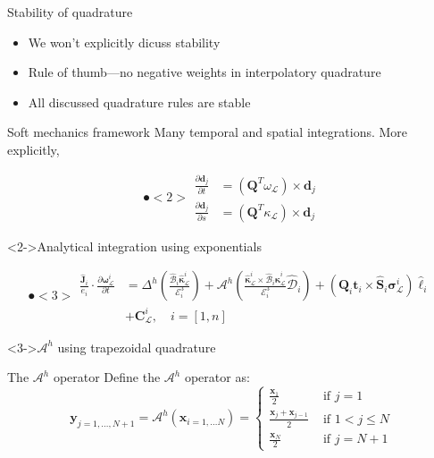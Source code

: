 \documentclass[presentation]{beamer}
\newcommand{\bv}[1]{\ensuremath{\mathbf{#1}}}
\begin{document}
\begin{frame}[label={sec:org7111bb9}]{Stability of quadrature}
\begin{itemize}
\item We won't explicitly dicuss stability
\item \alert{Rule of thumb}---no negative weights in interpolatory quadrature
\item All discussed quadrature rules are stable
\end{itemize}
\end{frame}
\begin{frame}[label={sec:orgde94351}]{Soft mechanics framework}
Many temporal and spatial integrations. More explicitly,

\[ \spot<2>{\begin{aligned}
   \frac{\partial \bv{d}_j}{\partial t} &= \left( \bv{Q}^T
   \omega_{\mathcal{L}}\right) \times \bv{d}_j \\
   \frac{\partial \bv{d}_j}{\partial s} &= \left( \bv{Q}^T
   \kappa_{\mathcal{L}}\right) \times \bv{d}_j
   \end{aligned}} \]
\begin{block}<2->{Analytical integration using exponentials}
\end{block}
\[ \spot<3>{\begin{aligned}\frac{\hat{\mathbf{J}}_i}{e_i} \cdot \frac{\partial
	\boldsymbol{\omega}^i_{\mathcal{L}}}{\partial t} &=
	\Delta^h\left(\frac{\hat{\boldsymbol{\mathcal{B}}}_i\hat{\boldsymbol{\kappa}}_{\mathcal{L}}^{i}}{\mathcal{E}_i^3}\right) +
	\mathcal{A}^h\left(\frac{\hat{\boldsymbol{\kappa}}_{\mathcal{L}}^i\times\hat{\boldsymbol{\mathcal{B}}}_i
	\hat{\boldsymbol{\kappa}}_{\mathcal{L}}^i}{\mathcal{E}_i^3}
	\hat{\mathcal{D}}_i\right) + \left(\mathbf{Q}_i\mathbf{t}_i\times\hat{\mathbf{S}}_i\boldsymbol{\sigma}^i_{\mathcal{L}}\right)\hat{\ell}_i\\
	&+ \mathbf{C}^i_{\mathcal{L}},\quad i=[1,n] \end{aligned}}\]
\begin{block}<3->{\(\mathcal{A}^{h}\) using trapezoidal quadrature}
\end{block}
\end{frame}
\begin{frame}[label={sec:org1c0b18f}]{The \(\mathcal{A}^{h}\) operator}
Define the \(\mathcal{A}^{h}\) operator as:
\[ \mathbf{y}_{j=1, \ldots, N+1}=\mathcal{A}^{h}\left(\mathbf{x}_{i=1, \ldots
   N}\right)=\left\{\begin{array}{ll}{\frac{\mathbf{x}_{1}}{2}} & {\text { if }
   j=1} \\ {\frac{\mathbf{x}_{j}+\mathbf{x}_{j-1}}{2}} & {\text { if } 1<j \leq
   N} \\ {\frac{\mathbf{x}_{N}}{2}} & {\text { if } j=N+1}\end{array}\right. \]
\end{frame}
\end{document}
